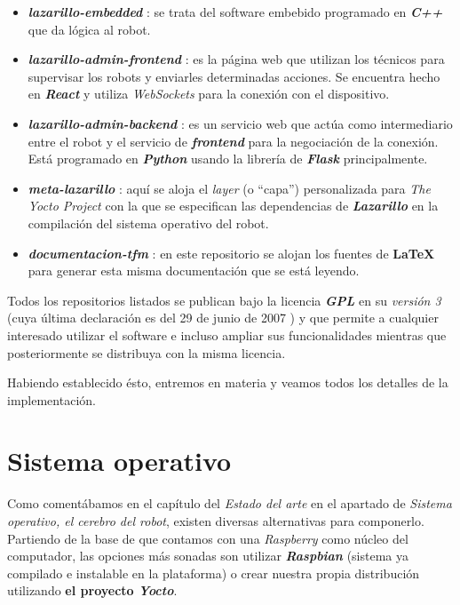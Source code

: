 \begin{itemize}
	\item \textbf{\textit{lazarillo-embedded}} \cite{lazarillo-embedded}: se trata del software embebido programado en \textbf{\textit{C++}} que da lógica al robot.
	\item \textbf{\textit{lazarillo-admin-frontend}} \cite{lazarillo-admin-frontend}: es la página web que utilizan los técnicos para supervisar los robots y enviarles determinadas acciones. Se encuentra hecho en \textbf{\textit{React}} y utiliza \textit{WebSockets} para la conexión con el dispositivo.
	\item \textbf{\textit{lazarillo-admin-backend}} \cite{lazarillo-admin-backend}: es un servicio web que actúa como intermediario entre el robot y el servicio de \textbf{\textit{frontend}} para la negociación de la conexión. Está programado en \textbf{\textit{Python}} usando la librería de \textbf{\textit{Flask}} principalmente.
	\item \textbf{\textit{meta-lazarillo}} \cite{meta-lazarillo}: aquí se aloja el \textit{layer} (o ``capa'') personalizada para \textit{The Yocto Project} con la que se especifican las dependencias de \textbf{\textit{Lazarillo}} en la compilación del sistema operativo del robot.
	\item \textbf{\textit{documentacion-tfm}} \cite{documentacion-tfm}: en este repositorio se alojan los fuentes de \textbf{\LaTeX} para generar esta misma documentación que se está leyendo.
\end{itemize}

Todos los repositorios listados se publican bajo la licencia \textbf{\textit{GPL}} en su \textit{versión 3} (cuya última declaración es del 29 de junio de 2007 \cite{gplv3}) y que permite a cualquier interesado utilizar el software e incluso ampliar sus funcionalidades mientras que posteriormente se distribuya con la misma licencia.

Habiendo establecido ésto, entremos en materia y veamos todos los detalles de la implementación.\\


\section{Sistema operativo}

Como comentábamos en el capítulo del \textit{Estado del arte} en el apartado de \textit{Sistema operativo, el cerebro del robot}, existen diversas alternativas para componerlo. Partiendo de la base de que contamos con una \textit{Raspberry} como núcleo del computador, las opciones más sonadas son utilizar \textit{\textbf{Raspbian}} (sistema ya compilado e instalable en la plataforma) o crear nuestra propia distribución utilizando \textbf{el proyecto \textit{Yocto}}.\\


